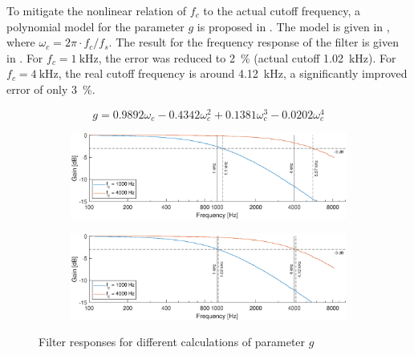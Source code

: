 \documentclass[a4paper, 12pt]{article}
\begin{document}
To mitigate the nonlinear relation of $f_c$ to the actual cutoff frequency, a polynomial model for the parameter $g$ is proposed in \cite{Vaelimaeki2006}. The model is given in , where $\omega_c = 2 \pi \cdot f_c / f_s$. The result for the frequency response of the filter is given in . For $f_c = \SI{1}{\kilo\hertz}$, the error was reduced to \SI{2}{\percent} (actual cutoff \SI{1.02}{\kilo\hertz}). For $f_c = \SI{4}{\kilo\hertz}$, the real cutoff frequency is around \SI{4.12}{\kilo\hertz}, a significantly improved error of only \SI{3}{\percent}.

\begin{equation}
	\label{eq:polynom-fit}
	g = 0.9892 \omega_c - 0.4342 \omega_c^2 + 0.1381 \omega_c^3 - 0.0202 \omega_c^4
\end{equation}

\begin{figure} [!ht]
	\centering
	\begin{subfigure}[b]{0.9\textwidth}
		\centering
		\includegraphics[width=\textwidth]{primitive-responses.eps}
		\label{fig:prim-resp}
	\end{subfigure}
	\begin{subfigure}[b]{0.9\textwidth}
		\centering
		\includegraphics[width=\textwidth]{improved-responses.eps}
		\label{fig:ext-resp}
	\end{subfigure}
	\caption{Filter responses for different calculations of parameter $g$}
	\label{fig:g-resp}
\end{figure}
\end{document}
